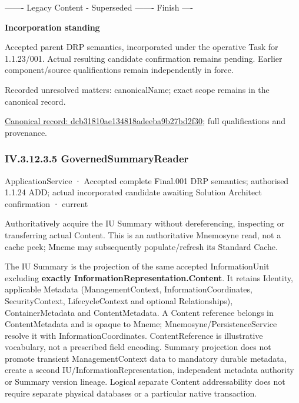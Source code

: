 ------- Legacy Content - Superseded ------- Finish ----



\par\medskip\textbf{Incorporation standing}\par


Accepted parent DRP semantics, incorporated under the operative Task for 1.1.23/001. Actual resulting candidate confirmation remains pending. Earlier component/source qualifications remain independently in force.


{\small Recorded unresolved matters: canonicalName; exact scope remains in the canonical record.}\par
{\footnotesize \href{../../../../../../../continuum/application/application-service/dcb31810ae134818adeeba9b27bd2f30.md}{Canonical record: dcb31810ae134818adeeba9b27bd2f30}; full qualifications and provenance.}\par
\subsubsection*{IV.3.12.3.5 GovernedSummaryReader}
\label{navigation:IV.3.12.3.5}

\label{element:2988247b75664896a7deb97b12b20c0a}
{\small ApplicationService · Accepted complete Final.001 DRP semantics; authorised 1.1.24 ADD; actual incorporated candidate awaiting Solution Architect confirmation · current}\par

Authoritatively acquire the IU Summary without dereferencing, inspecting or transferring actual Content. This is an authoritative Mnemosyne read, not a cache peek; Mneme may subsequently populate/refresh its Standard Cache.



The IU Summary is the projection of the same accepted InformationUnit excluding \textbf{exactly InformationRepresentation.Content}. It retains Identity, applicable Metadata (ManagementContext, InformationCoordinates, SecurityContext, LifecycleContext and optional Relationships), ContainerMetadata and ContentMetadata. A Content reference belongs in ContentMetadata and is opaque to Mneme; Mnemosyne/PersistenceService resolve it with InformationCoordinates. ContentReference is illustrative vocabulary, not a prescribed field encoding. Summary projection does not promote transient ManagementContext data to mandatory durable metadata, create a second IU/InformationRepresentation, independent metadata authority or Summary version lineage. Logical separate Content addressability does not require separate physical databases or a particular native transaction.



